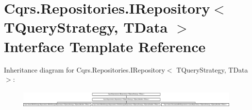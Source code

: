 \hypertarget{interfaceCqrs_1_1Repositories_1_1IRepository}{}\section{Cqrs.\+Repositories.\+I\+Repository$<$ T\+Query\+Strategy, T\+Data $>$ Interface Template Reference}
\label{interfaceCqrs_1_1Repositories_1_1IRepository}
Inheritance diagram for Cqrs.\+Repositories.\+I\+Repository$<$ T\+Query\+Strategy, T\+Data $>$\+:\begin{figure}[H]
\begin{center}
\leavevmode
\includegraphics[height=0.907618cm]{interfaceCqrs_1_1Repositories_1_1IRepository}
\end{center}
\end{figure}
